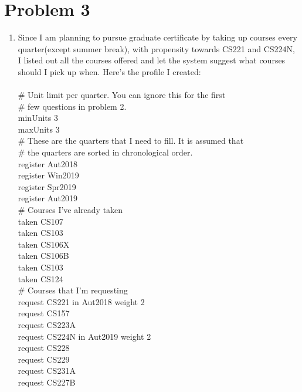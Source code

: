 \documentclass[12pt]{article}
\begin{document}
\section*{Problem 3}
\begin{enumerate}[label=(\alph*)]
\addtocounter{enumi}{2}
\item Since I am planning to pursue graduate certificate by taking up courses every quarter(except summer break), with propensity towards CS221 and CS224N, I listed out all the courses offered and let the system suggest what courses should I pick up when. Here's the profile I created: \\ \\
\# Unit limit per quarter. You can ignore this for the first \\
\# few questions in problem 2. \\
minUnits 3 \\
maxUnits 3 \\

\# These are the quarters that I need to fill. It is assumed that \\
\# the quarters are sorted in chronological order. \\
register Aut2018 \\
register Win2019 \\
register Spr2019 \\
register Aut2019 \\

\# Courses I've already taken \\
taken CS107 \\
taken CS103 \\
taken CS106X \\
taken CS106B \\
taken CS103 \\
taken CS124 \\

\# Courses that I'm requesting \\
request CS221 in Aut2018 weight 2 \\
request CS157 \\
request CS223A \\
request CS224N in Aut2019 weight 2 \\
request CS228 \\
request CS229 \\
request CS231A \\
request CS227B \\


\end{enumerate}
\end{document}
